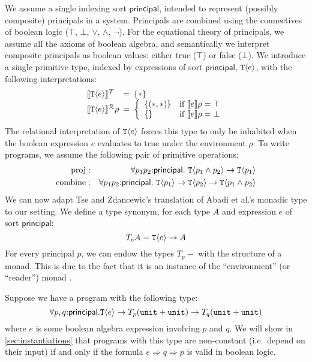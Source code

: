 We assume a single indexing sort $\mathsf{principal}$, intended to
represent (possibly composite) principals in a system. Principals are
combined using the connectives of boolean logic ($\top$, $\bot$,
$\lor$, $\land$, $\lnot$). For the equational theory of principals, we
assume all the axioms of boolean algebra, and semantically we
interpret composite principals as boolean values: either true ($\top$)
or false ($\bot$). We introduce a single primitive type, indexed by
expressions of sort $\mathsf{principal}$, $\texttt{T}\langle e \rangle$, with the
following interpretations:
\begin{displaymath}
  \begin{array}{l@{\hspace{0.5em}=\hspace{0.5em}}l}
    \tySem{\tyPrim{T}{e}} & \{*\} \\
    \rsem{\tyPrim{T}{e}}{}\rho & \left\{
      \begin{array}{ll}
        \{(*,*)\} & \textrm{if }\sem{e}\rho = \top \\
        \{\}      & \textrm{if }\sem{e}\rho = \bot
      \end{array}
      \right.
  \end{array}
\end{displaymath}
The relational interpretation of $\texttt{T}\langle e \rangle$ forces this type to
only be inhabited when the boolean expression $e$ evaluates to true
under the environment $\rho$. To write programs, we assume the
following pair of primitive operations:
\begin{eqnarray*}
  \mathrm{proj} & : & \forall p_1 p_2\mathord:\mathsf{principal}.\ \texttt{T}\langle p_1 \land p_2 \rangle \to \texttt{T}\langle p_1 \rangle \\
  \mathrm{combine} & : & \forall p_1 p_2\mathord:\mathsf{principal}.\ \texttt{T}\langle p_1 \rangle \to \texttt{T}\langle p_2 \rangle \to \texttt{T}\langle p_1 \land p_2 \rangle
\end{eqnarray*}
We can now adapt Tse and Zdancewic's translation of Abadi et al.'s
monadic type to our setting. We define a type synonym, for each type
$A$ and expression $e$ of sort $\mathsf{principal}$:
\begin{displaymath}
  T_eA = \texttt{T}\langle e \rangle \to A
\end{displaymath}
For every principal $p$, we can endow the types $T_p-$ with the
structure of a monad. This is due to the fact that it is an instance
of the ``environment'' (or ``reader'') monad .

\begin{example}
  Suppose we have a program with the following type:
  \begin{displaymath}
    \forall p,q\mathord:\mathsf{principal}. \texttt{T}\langle e \rangle \to T_p(\texttt{unit} + \texttt{unit}) \to T_q(\texttt{unit} + \texttt{unit})
  \end{displaymath}
  where $e$ is some boolean algebra expression involving $p$ and
  $q$. We will show in \autoref{sec:instantiations} that programs with
  this type are non-constant (i.e.~depend on their input) if and only
  if the formula $e \Rightarrow q \Rightarrow p$ is valid in boolean
  logic.
\end{example}


